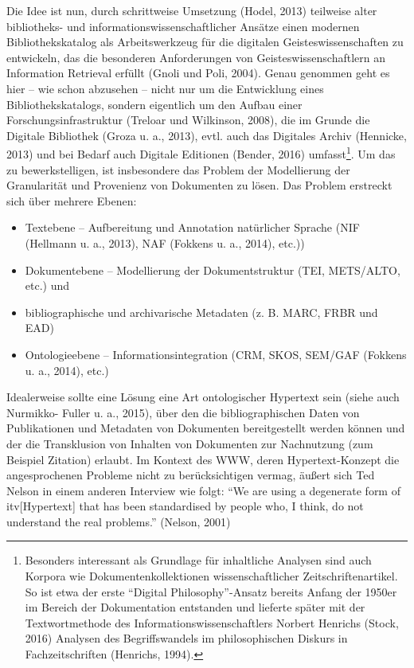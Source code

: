 \documentclass[a4paper,
fontsize=11pt,
oneside,
numbers=noperiodatend,
parskip=half-,
bibliography=totoc,
final
]{scrartcl}
\begin{document}
Die Idee ist nun, durch schrittweise Umsetzung (Hodel, 2013) teilweise
alter bibliotheks- und informationswissenschaftlicher Ansätze einen
modernen Bibliothekskatalog als Arbeitswerkzeug für die digitalen
Geisteswissenschaften zu entwickeln, das die besonderen Anforderungen
von Geisteswissenschaftlern an Information Retrieval erfüllt (Gnoli und
Poli, 2004). Genau genommen geht es hier -- wie schon abzusehen -- nicht
nur um die Entwicklung eines Bibliothekskatalogs, sondern eigentlich um
den Aufbau einer Forschungsinfrastruktur (Treloar und Wilkinson, 2008),
die im Grunde die Digitale Bibliothek (Groza u. a., 2013), evtl. auch
das Digitales Archiv (Hennicke, 2013) und bei Bedarf auch Digitale
Editionen (Bender, 2016) umfasst\footnote{Besonders interessant als
  Grundlage für inhaltliche Analysen sind auch Korpora wie
  Dokumentenkollektionen wissenschaftlicher Zeitschriftenartikel. So ist
  etwa der erste \enquote{Digital Philosophy}-Ansatz bereits Anfang der
  1950er im Bereich der Dokumentation entstanden und lieferte später mit
  der Textwortmethode des Informationswissenschaftlers Norbert Henrichs
  (Stock, 2016) Analysen des Begriffswandels im philosophischen Diskurs
  in Fachzeitschriften (Henrichs, 1994).}. Um das zu bewerkstelligen,
ist insbesondere das Problem der Modellierung der Granularität und
Provenienz von Dokumenten zu lösen. Das Problem erstreckt sich über
mehrere Ebenen:

\begin{itemize}
\tightlist
\item
  Textebene -- Aufbereitung und Annotation natürlicher Sprache (NIF
  (Hellmann u. a., 2013), NAF (Fokkens u. a., 2014), etc.))
\item
  Dokumentebene -- Modellierung der Dokumentstruktur (TEI, METS/ALTO,
  etc.) und
\item
  bibliographische und archivarische Metadaten (z. B. MARC, FRBR und
  EAD)
\item
  Ontologieebene -- Informationsintegration (CRM, SKOS, SEM/GAF (Fokkens
  u. a., 2014), etc.)
\end{itemize}

Idealerweise sollte eine Lösung eine Art ontologischer Hypertext sein
(siehe auch Nurmikko- Fuller u. a., 2015), über den die
bibliographischen Daten von Publikationen und Metadaten von Dokumenten
bereitgestellt werden können und der die Transklusion von Inhalten von
Dokumenten zur Nachnutzung (zum Beispiel Zitation) erlaubt. Im Kontext
des WWW, deren Hypertext-Konzept die angesprochenen Probleme nicht zu
berücksichtigen vermag, äußert sich Ted Nelson in einem anderen
Interview wie folgt: \enquote{We are using a degenerate form of
itv{[}Hypertext{]} that has been standardised by people who, I think, do
not understand the real problems.} (Nelson, 2001)
\end{document}
